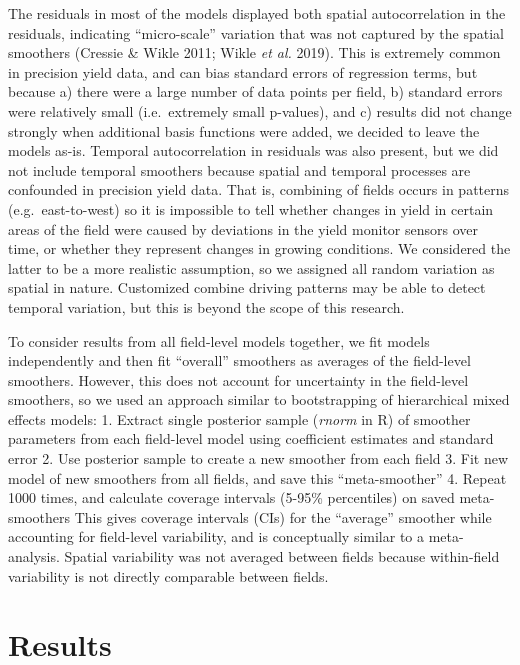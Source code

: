\documentclass[]{elsarticle} %
\begin{document}
The residuals in most of the models displayed both spatial autocorrelation in the residuals, indicating ``micro-scale'' variation that was not captured by the spatial smoothers (Cressie \& Wikle 2011; Wikle \emph{et al.} 2019).
This is extremely common in precision yield data, and can bias standard errors of regression terms, but because a) there were a large number of data points per field, b) standard errors were relatively small (i.e.~extremely small p-values), and c) results did not change strongly when additional basis functions were added, we decided to leave the models as-is.
Temporal autocorrelation in residuals was also present, but we did not include temporal smoothers because spatial and temporal processes are confounded in precision yield data.
That is, combining of fields occurs in patterns (e.g.~east-to-west) so it is impossible to tell whether changes in yield in certain areas of the field were caused by deviations in the yield monitor sensors over time, or whether they represent changes in growing conditions.
We considered the latter to be a more realistic assumption, so we assigned all random variation as spatial in nature.
Customized combine driving patterns may be able to detect temporal variation, but this is beyond the scope of this research.

To consider results from all field-level models together, we fit models independently and then fit ``overall'' smoothers as averages of the field-level smoothers.
However, this does not account for uncertainty in the field-level smoothers, so we used an approach similar to bootstrapping of hierarchical mixed effects models:
1. Extract single posterior sample (\emph{rnorm} in R) of smoother parameters from each field-level model using coefficient estimates and standard error
2. Use posterior sample to create a new smoother from each field
3. Fit new model of new smoothers from all fields, and save this ``meta-smoother''
4. Repeat 1000 times, and calculate coverage intervals (5-95\% percentiles) on saved meta-smoothers
This gives coverage intervals (CIs) for the ``average'' smoother while accounting for field-level variability, and is conceptually similar to a meta-analysis.
Spatial variability was not averaged between fields because within-field variability is not directly comparable between fields.

\hypertarget{results}{%
\section{Results}\label{results}}
\end{document}
